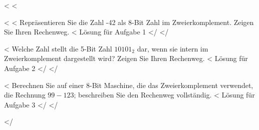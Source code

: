 <%
<%
\begin{enumerate}
	<%
	<%
        Repräsentieren Sie die Zahl -42 als 8-Bit Zahl im Zweierkomplement. Zeigen Sie Ihren Rechenweg.
		<%
		Lösung für Aufgabe 1
		</%
	</%

	<%
        Welche Zahl stellt die 5-Bit Zahl $10101_2$ dar, wenn sie intern im Zweierkomplement dargestellt wird? Zeigen Sie Ihren Rechenweg.
		<%
		Lösung für Aufgabe 2
		</%
	</%

	<%
        Berechnen Sie auf einer 8-Bit Maschine, die das Zweierkomplement verwendet, die Rechnung $99 - 123$; beschreiben Sie den Rechenweg vollständig.
		<%
		Lösung für Aufgabe 3
		</%
	</%
\end{enumerate}
</%
